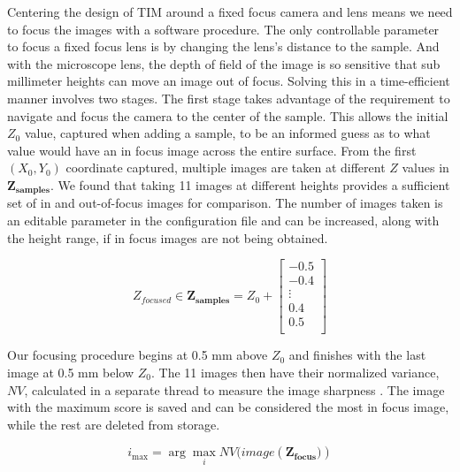 \documentclass[a4paper,12pt]{article}
\begin{document}
Centering the design of TIM around a fixed focus camera and lens means we need to focus the images with a software procedure.
The only controllable parameter to focus a fixed focus lens is by changing the lens's distance to the sample. 
And with the microscope lens, the depth of field of the image is so sensitive that sub millimeter heights can move an image out of focus.
Solving this in a time-efficient manner involves two stages. 
The first stage takes advantage of the requirement to navigate and focus the camera to the center of the sample.
This allows the initial $Z_0$ value, captured when adding a sample, to be an informed guess as to what value would have an in focus image across the entire surface. 
From the first $(X_0, Y_0)$ coordinate captured, multiple images are taken at different $Z$ values in $\boldsymbol{Z_{\text{samples}}}$. 
We found that taking 11 images at different heights provides a sufficient set of in and out-of-focus images for comparison. The number of images taken is an editable parameter in the configuration file and can be increased, along with the height range, if in focus images are not being obtained.

\[
Z_{focused} \in
\boldsymbol{Z_{\text{samples}}} = 
Z_0 + 
\begin{bmatrix}
-0.5 \\
-0.4 \\
\vdots \\
0.4 \\
0.5 \\
\end{bmatrix}
\] %

Our focusing procedure begins at 0.5 mm above $Z_0$ and finishes with the last image at 0.5 mm below $Z_0$.
The 11 images then have their normalized variance, $NV$, calculated in a separate thread to measure the image sharpness \citep{sampat_extensive_2014}.
The image with the maximum score is saved and can be considered the most in focus image, while the rest are deleted from storage.

\[
  i_{\max} = \arg\max_{i} NV(image(\boldsymbol{{Z_\text{focus}})})
  \]
\end{document}

